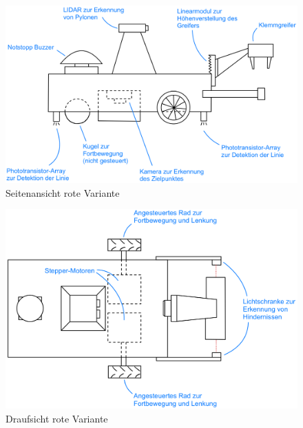 \documentclass[main.tex]{subfiles} %
\begin{document}
\begin{figure}[h] %
    \centering %
    \includegraphics[width=1\textwidth]{./Skizzen/Sketch_Side.png} %
    \caption{Seitenansicht rote Variante} %
    \label{fig:Sketch_Side} %
\end{figure}

\begin{figure}[h] %
    \centering %
    \includegraphics[width=1\textwidth]{./Skizzen/Sketch_Top.png} %
    \caption{Draufsicht rote Variante} %
    \label{fig:Sketch_Top} %
\end{figure}
\end{document}
